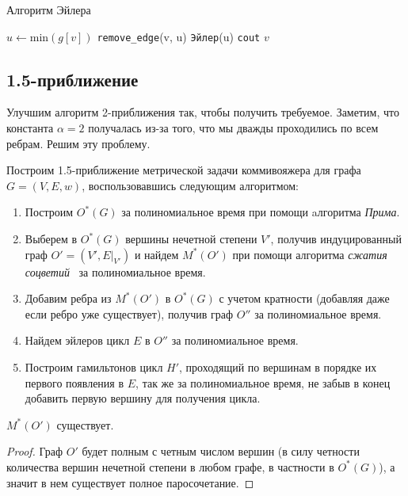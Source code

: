 \begin{algorithm}[H]
    \caption{Алгоритм Эйлера}
    \begin{algorithmic}[1]
        \State $u \gets \text{min}(g[v])$
        \State \texttt{remove\_edge}(v, u)
        \State \texttt{Эйлер}(u)
        \EndWhile
        \State \texttt{cout} $v$
    \end{algorithmic}
\end{algorithm}

\subsection{1.5-приближение}
Улучшим алгоритм 2-приближения так, чтобы получить требуемое.
Заметим, что константа $\alpha = 2$ получалась из-за того, что мы дважды проходились по всем ребрам.
Решим эту проблему.

Построим 1.5-приближение метрической задачи коммивояжера для графа $G = (V, E, w)$, воспользовавшись следующим алгоритмом:
\begin{enumerate}[label=\arabic*.]
    \item Построим $O^*(G)$ за полиномиальное время при помощи aлгоритма \textit{Прима}.
    \item Выберем в $O^*(G)$ вершины нечетной степени $V'$, получив индуцированный граф $O' = (V', E|_{V'})$ и найдем $M^*(O')$ при помощи алгоритма \textit{сжатия соцветий}~\cite{shoemaker2016blossom} за полиномиальное время.
    \item Добавим ребра из $M^*(O')$ в $O^*(G)$ с учетом кратности (добавляя даже если ребро уже существует), получив граф $O''$ за полиномиальное время.
    \item Найдем эйлеров цикл $E$ в $O''$ за полиномиальное время.
    \item Построим гамильтонов цикл $H'$, проходящий по вершинам в порядке их первого появления в $E$, так же за полиномиальное время,
          не забыв в конец добавить первую вершину для получения цикла.
\end{enumerate}

\begin{lemma}
    \label{lemma:2-3}
    $M^*(O')$ существует.
\end{lemma}
\begin{proof}
    Граф $O'$ будет полным с четным числом вершин (в силу четности количества вершин нечетной степени в любом графе, в частности в $O^*(G)$),
    а значит в нем существует полное паросочетание.
\end{proof}

